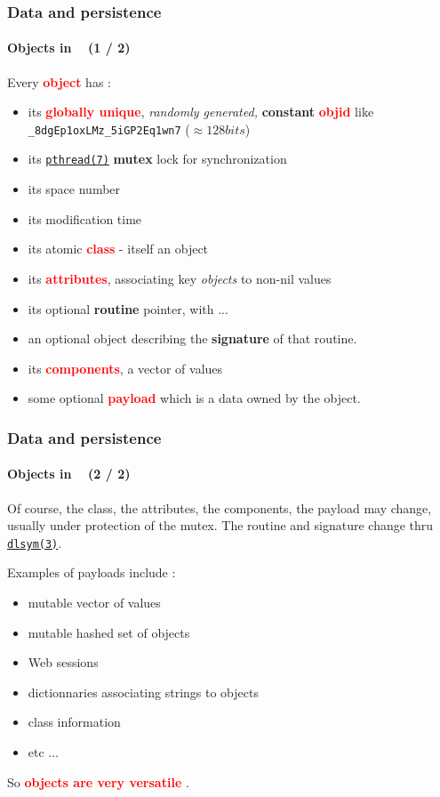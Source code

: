 \documentclass[xcolor=svgnames,final,smaller,a4]{beamer}
\begin{document}
\begin{frame}
    \frametitle{Data and persistence}
    \framesubtitle{Objects in \Bismon ~ (1 / 2)}

    Every \textcolor{red}{\textbf{object}} has : 
    \begin{itemize}
    \item its \textcolor{red}{\textbf{globally unique}}, \textit{randomly generated,}  \textbf{constant} \textcolor{red}{\textbf{objid}} like \texttt{\_8dgEp1oxLMz\_5iGP2Eq1wn7} ($\approx 128 bits$)
    \item its {\href{http://man7.org/linux/man-pages/man7/pthreads.7.html}{\texttt{pthread(7)}}} \textbf{mutex} lock for synchronization
    \item its space number
    \item its modification time
    \item its atomic {\textcolor{red}{\textbf{class}}} - itself an object
    \item its {\textcolor{red}{\textbf{attributes}}}, associating key \textit{objects} to non-nil values
    \item its optional \textbf{routine} pointer, with ...
    \item an optional object describing the \textbf{signature} of that routine.
  \item its {\textcolor{red}{\textbf{components}}}, a vector of values
  \item some optional {\textcolor{red}{\textbf{payload}}} which is a data owned by the object. 
    \end{itemize}

\end{frame}


\begin{frame}
    \frametitle{Data and persistence}
    \framesubtitle{Objects in \Bismon ~ (2 / 2)}
    
Of course, the class, the attributes, the components, the payload may
change, usually under protection of the mutex.  The routine and
signature change thru
{\href{http://man7.org/linux/man-pages/man3/dlsym.3.html}{\texttt{dlsym(3)}}}.

Examples of payloads include :
\begin{itemize}
\item mutable vector of values
\item mutable hashed set of objects
\item Web sessions
\item dictionnaries associating strings to objects
\item class information {}
\item etc ...
\end{itemize}

So {\Bismon} {\textcolor{red}{\textbf{objects are very versatile}}} {}.
\end{frame}
\end{document}
